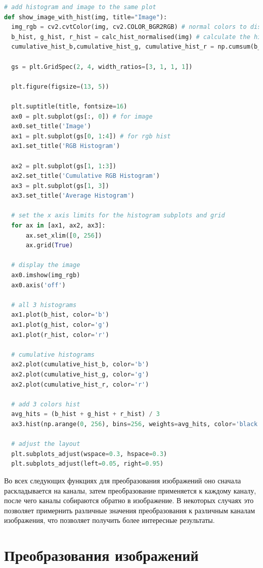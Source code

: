 \documentclass[a4paper, 12pt]{extarticle}
\begin{document}
\begin{lstlisting}[language=Python]
# add histogram and image to the same plot
def show_image_with_hist(img, title="Image"):
  img_rgb = cv2.cvtColor(img, cv2.COLOR_BGR2RGB) # normal colors to display
  b_hist, g_hist, r_hist = calc_hist_normalised(img) # calculate the histograms
  cumulative_hist_b,cumulative_hist_g, cumulative_hist_r = np.cumsum(b_hist), np.cumsum(g_hist), np.cumsum(r_hist) # calculate the cumulative histograms

  gs = plt.GridSpec(2, 4, width_ratios=[3, 1, 1, 1])

  plt.figure(figsize=(13, 5))

  plt.suptitle(title, fontsize=16)
  ax0 = plt.subplot(gs[:, 0]) # for image 
  ax0.set_title('Image')
  ax1 = plt.subplot(gs[0, 1:4]) # for rgb hist
  ax1.set_title('RGB Histogram')

  ax2 = plt.subplot(gs[1, 1:3])
  ax2.set_title('Cumulative RGB Histogram')
  ax3 = plt.subplot(gs[1, 3])
  ax3.set_title('Average Histogram')

  # set the x axis limits for the histogram subplots and grid
  for ax in [ax1, ax2, ax3]:
      ax.set_xlim([0, 256])
      ax.grid(True)

  # display the image
  ax0.imshow(img_rgb)
  ax0.axis('off')

  # all 3 histograms
  ax1.plot(b_hist, color='b')
  ax1.plot(g_hist, color='g')
  ax1.plot(r_hist, color='r')

  # cumulative histograms
  ax2.plot(cumulative_hist_b, color='b')
  ax2.plot(cumulative_hist_g, color='g')
  ax2.plot(cumulative_hist_r, color='r')

  # add 3 colors hist
  avg_hits = (b_hist + g_hist + r_hist) / 3
  ax3.hist(np.arange(0, 256), bins=256, weights=avg_hits, color='black')

  # adjust the layout
  plt.subplots_adjust(wspace=0.3, hspace=0.3)
  plt.subplots_adjust(left=0.05, right=0.95)  
\end{lstlisting}

Во всех следующих функциях для преобразования изображений оно сначала раскладывается на каналы, затем преобразование применяется к каждому каналу, после чего каналы собираются обратно в изображение. 
В некоторых случаях это позволяет примернить различные значения преобразования к различным каналам изображения, что позволяет получить более интересные результаты.

\section{Преобразования изображений}
\end{document}
